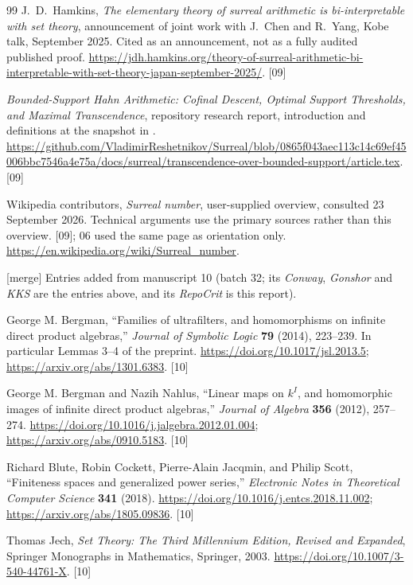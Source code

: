 \documentclass[11pt,letterpaper]{article}
\numberwithin{equation}{section}
\theoremstyle{definition}
\theoremstyle{remark}
\newcommand{\src}[1]{\textup{\textsf{\small[#1]}}}%
\newcommand{\mergetag}{\textup{\textsf{\small[merge]}}}%
\begin{document}
\begin{thebibliography}{99}
J.~D.~Hamkins, \emph{The elementary theory of surreal arithmetic is
bi-interpretable with set theory}, announcement of joint work with
J.~Chen and R.~Yang, Kobe talk, September 2025. Cited as an announcement,
not as a fully audited published proof.
\url{https://jdh.hamkins.org/theory-of-surreal-arithmetic-bi-interpretable-with-set-theory-japan-september-2025/}.
\src{09}

\emph{Bounded-Support Hahn Arithmetic: Cofinal Descent, Optimal Support
Thresholds, and Maximal Transcendence}, repository research report,
introduction and definitions at the snapshot in \cite{Repo}.
\url{https://github.com/VladimirReshetnikov/Surreal/blob/0865f043aec113c14c69ef45006bbc7546a4e75a/docs/surreal/transcendence-over-bounded-support/article.tex}.
\src{09}

Wikipedia contributors, \emph{Surreal number}, user-supplied overview,
consulted 23 September 2026. Technical arguments use the primary sources
rather than this overview. \src{09}; 06 used the same page as orientation
only.
\url{https://en.wikipedia.org/wiki/Surreal_number}.

\medskip\noindent\mergetag{} Entries added from manuscript 10 (batch 32; its
\emph{Conway}, \emph{Gonshor} and \emph{KKS} are the entries above, and its
\emph{RepoCrit} is this report).

George M. Bergman,
``Families of ultrafilters, and homomorphisms on infinite direct product
algebras,'' \emph{Journal of Symbolic Logic} \textbf{79} (2014), 223--239.
In particular Lemmas 3--4 of the preprint.
\url{https://doi.org/10.1017/jsl.2013.5};
\url{https://arxiv.org/abs/1301.6383}. \src{10}

George M. Bergman and Nazih Nahlus,
``Linear maps on $k^I$, and homomorphic images of infinite direct product
algebras,'' \emph{Journal of Algebra} \textbf{356} (2012), 257--274.
\url{https://doi.org/10.1016/j.jalgebra.2012.01.004};
\url{https://arxiv.org/abs/0910.5183}. \src{10}

Richard Blute, Robin Cockett, Pierre-Alain Jacqmin, and Philip Scott,
``Finiteness spaces and generalized power series,''
\emph{Electronic Notes in Theoretical Computer Science} \textbf{341}
(2018).
\url{https://doi.org/10.1016/j.entcs.2018.11.002};
\url{https://arxiv.org/abs/1805.09836}. \src{10}

Thomas Jech, \emph{Set Theory: The Third Millennium Edition, Revised and
Expanded}, Springer Monographs in Mathematics, Springer, 2003.
\url{https://doi.org/10.1007/3-540-44761-X}. \src{10}


\end{thebibliography}
\end{document}
